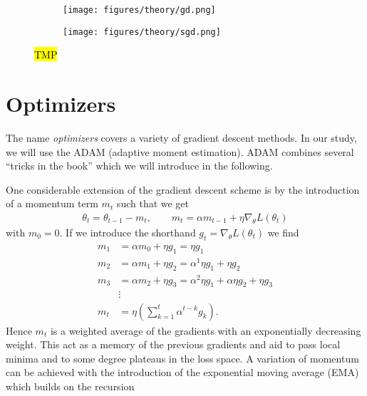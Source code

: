 \begin{figure}[H]
  \centering
  \begin{subfigure}[t]{0.49\textwidth}
    \centering
    \texttt{[image: figures/theory/gd.png]}
    \caption{}
    \label{fig:gd}
  \end{subfigure}
  \hfill
  \begin{subfigure}[t]{0.49\textwidth}
    \centering
    \texttt{[image: figures/theory/sgd.png]}
    \caption{}
    \label{fig:sgd}
  \end{subfigure}
  \hfill
  \caption{\hl{TMP}}
  \label{fig:gradient_descent}
\end{figure}



\section{Optimizers}

The name \textit{optimizers} covers a variety of gradient descent methods. In our study, we will use the ADAM (adaptive moment estimation). ADAM combines several ``tricks in the book'' which we will introduce in the following.

One considerable extension of the gradient descent scheme is by the introduction of a momentum term $m_t$ such that we get
\begin{align}
  \theta_t = \theta_{t-1} - m_t, \qquad m_t = \alpha m_{t-1} + \eta \nabla_\theta L(\theta_t)
  \label{eq:mom}
\end{align}
with $m_0 = 0$. If we introduce the shorthand $g_t = \nabla_\theta L(\theta_t)$ we find
\begin{align}
  m_1 &= \alpha m_0 + \eta g_1 = \eta g_1 \nonumber \\
  m_2 &= \alpha m_1 + \eta g_2 = \alpha^1 \eta g_1 + \eta g_2 \nonumber \\
  m_3 &= \alpha m_2 + \eta g_3 = \alpha^2 \eta g_1 + \alpha\eta g_2 + \eta g_3 \nonumber \\
  &\vdots \nonumber \\
  m_t &= \eta \left(\sum_{k=1}^{t} \alpha^{t-k}g_k\right).
  \label{eq:mom_rec}
\end{align}
Hence $m_t$ is a weighted average of the gradients with an exponentially decreasing weight. This act as a memory of the previous gradients and aid to pass local minima and to some degree plateaus in the loss space. A variation of momentum can be achieved with the introduction of the exponential moving average (EMA) which builds on the recursion

